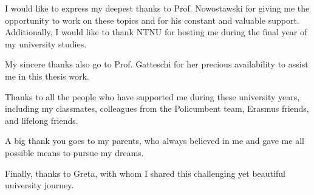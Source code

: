 I would like to express my deepest thanks to Prof. Nowostawski for giving me the opportunity to work on these topics and for his constant and valuable support. Additionally, I would like to thank NTNU for hosting me during the final year of my university studies.

My sincere thanks also go to Prof. Gatteschi for her precious availability to assist me in this thesis work.

Thanks to all the people who have supported me during these university years, including my classmates, colleagues from the Policumbent team, Erasmus friends, and lifelong friends. 

A big thank you goes to my parents, who always believed in me and gave me all possible means to pursue my dreams.

Finally, thanks to Greta, with whom I shared this challenging yet beautiful university journey.